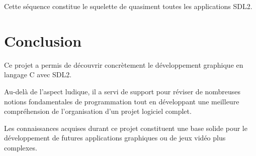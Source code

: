 \documentclass[a4paper,11pt]{article}
\begin{document}
Cette séquence constitue le squelette de quasiment toutes les applications SDL2.

\section{Conclusion}

Ce projet a permis de découvrir concrètement le développement graphique en langage C avec SDL2.

Au-delà de l'aspect ludique, il a servi de support pour réviser de nombreuses notions fondamentales de programmation tout en développant une meilleure compréhension de l'organisation d'un projet logiciel complet.

Les connaissances acquises durant ce projet constituent une base solide pour le développement de futures applications graphiques ou de jeux vidéo plus complexes.
\end{document}
